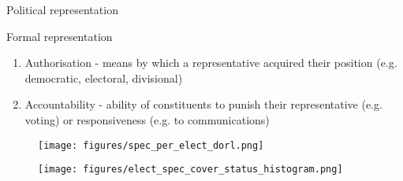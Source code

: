 \documentclass{beamer}
\begin{document}
\begin{frame}{Political representation}
\onslide<+->\begin{block}{Formal representation}
\end{block}
\begin{enumerate}
    \item Authorisation - means by which a representative acquired their position (e.g. democratic, electoral, divisional)
    \item Accountability - ability of constituents to punish their representative (e.g. voting) or responsiveness (e.g. to communications)
\end{enumerate}
\end{frame}

\begin{frame}{}
\begin{figure}
    \centering
    \texttt{[image: figures/spec\_per\_elect\_dorl.png]}
\end{figure}
\end{frame}

\begin{frame}{}
\begin{figure}
    \centering
    \texttt{[image: figures/elect\_spec\_cover\_status\_histogram.png]}
\end{figure}  
\end{frame}
\end{document}
